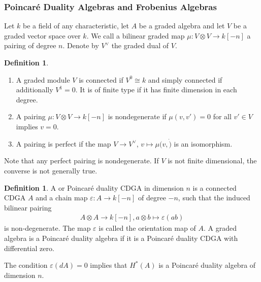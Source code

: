 \documentclass{scrartcl}
\let\emph\relax
\theoremstyle{plain}
\theoremstyle{definition}
\newtheorem{definition}[theorem]{Definition}
\renewcommand{\epsilon}{\varepsilon}
\newcommand{\iso}{\cong}
\begin{document}
\subsubsection{Poincaré Duality Algebras and Frobenius Algebras}

Let $k$ be a field of any characteristic, let $A$ be a graded algebra and let $V$ be a graded vector space over $k$. We call a bilinear graded map $\mu\colon V\otimes V\to k[-n]$ a pairing of degree $n$. Denote by $V^\vee$ the graded dual of $V$.

\begin{definition}
    \begin{enumerate}
        \item A graded module $V$ is connected if $V^0 \iso k$ and simply connected if additionally $V^1 = 0$. It is of finite type if it has finite dimension in each degree.
        \item A pairing $\mu\colon V\otimes V\to k[-n]$ is nondegenerate if $\mu(v, v') = 0$ for all $v'\in V$ implies $v=0$.
        \item A pairing is perfect if the map $V\to V^\vee$, $v\mapsto \mu(v,\dot)$ is an isomorphism. 
    \end{enumerate}
\end{definition}

Note that any perfect pairing is nondegenerate. If $V$ is not finite dimensional, the converse is not generally true. 

\begin{definition}
    A \emph{Poincaré duality algebra} or Poincaré duality CDGA in dimension $n$ is a connected CDGA $A$ and a chain map $\epsilon\colon A\to k[-n]$ of degree $-n$, such that the induced bilinear pairing
    \begin{align*}
        A\otimes A\to k[-n], a\otimes b\mapsto \epsilon(ab)
    \end{align*}
    is non-degenerate. The map $\epsilon$ is called the orientation map of $A$. A graded algebra is a Poincaré duality algebra if it is a Poincaré duality CDGA with differential zero. 
\end{definition}
The condition $\epsilon(dA) = 0$ implies that $H^*(A)$ is a Poincaré duality algebra of dimension $n$.
\end{document}

